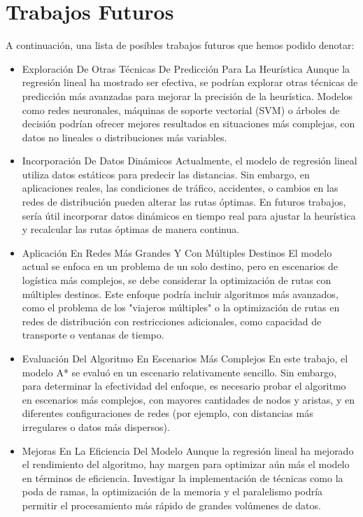 \documentclass[conference]{IEEEtran}
\begin{document}
	\section{Trabajos Futuros}
	
	A continuación, una lista de posibles trabajos futuros que hemos podido denotar:
	
	\begin{itemize}
	\item Exploración De Otras Técnicas De Predicción Para La Heurística
	Aunque la regresión lineal ha mostrado ser efectiva, se podrían explorar otras técnicas de predicción más avanzadas para mejorar la precisión de la heurística. Modelos como redes neuronales, máquinas de soporte vectorial (SVM) o árboles de decisión podrían ofrecer mejores resultados en situaciones más complejas, con datos no lineales o distribuciones más variables.
	
	\item Incorporación De Datos Dinámicos
	Actualmente, el modelo de regresión lineal utiliza datos estáticos para predecir las distancias. Sin embargo, en aplicaciones reales, las condiciones de tráfico, accidentes, o cambios en las redes de distribución pueden alterar las rutas óptimas. En futuros trabajos, sería útil incorporar datos dinámicos en tiempo real para ajustar la heurística y recalcular las rutas óptimas de manera continua.
	
	\item Aplicación En Redes Más Grandes Y Con Múltiples Destinos
	El modelo actual se enfoca en un problema de un solo destino, pero en escenarios de logística más complejos, se debe considerar la optimización de rutas con múltiples destinos. Este enfoque podría incluir algoritmos más avanzados, como el problema de los "viajeros múltiples" o la optimización de rutas en redes de distribución con restricciones adicionales, como capacidad de transporte o ventanas de tiempo.
	
	\item Evaluación Del Algoritmo En Escenarios Más Complejos
	En este trabajo, el modelo A* se evaluó en un escenario relativamente sencillo. Sin embargo, para determinar la efectividad del enfoque, es necesario probar el algoritmo en escenarios más complejos, con mayores cantidades de nodos y aristas, y en diferentes configuraciones de redes (por ejemplo, con distancias más irregulares o datos más dispersos).
	
	\item Mejoras En La Eficiencia Del Modelo
	Aunque la regresión lineal ha mejorado el rendimiento del algoritmo, hay margen para optimizar aún más el modelo en términos de eficiencia. Investigar la implementación de técnicas como la poda de ramas, la optimización de la memoria y el paralelismo podría permitir el procesamiento más rápido de grandes volúmenes de datos.
	

\end{itemize}
\end{document}
